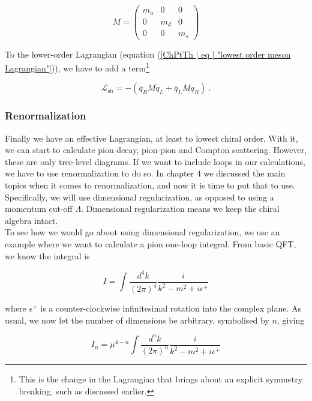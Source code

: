 \documentclass[10pt,twoside]{report}
\begin{document}
	\begin{equation}
		M = \begin{pmatrix}
		m_u & 0 & 0 \\
		0 & m_d & 0 \\
		0 & 0 & m_s
		\end{pmatrix}
	\end{equation}
	
	To the lower-order Lagrangian (equation (\ref{ChPtTh | eq | "lowest order meson Lagrangian"})), we have to add a term\footnote{This is the change in the Lagrangian that brings about an explicit symmetry breaking, such as discussed earlier.}
	
	\begin{equation}
		\mathcal{L}_{\text{sb}} = -\left( \bar{q}_R M q_L + \bar{q}_LMq_R \right) \:.
	\end{equation}
	
	\subsubsection{Renormalization}
	Finally we have an effective Lagrangian, at least to lowest chiral order. With it, we can start to calculate pion decay, pion-pion and Compton scattering. However, these are only tree-level diagrams. If we want to include loops in our calculations, we have to use renormalization to do so. In chapter 4 we discussed the main topics when it comes to renormalization, and now it is time to put that to use. Specifically, we will use dimensional regularization, as opposed to using a momentum cut-off $\Lambda$. Dimensional regularization means we keep the chiral algebra intact.\\
	
	To see how we would go about using dimensional regularization, we use an example \cite{SchererSchingler12} where we want to calculate a pion one-loop integral. From basic QFT, we know the integral is
	
	\begin{equation}
		I = \int\frac{d^4 k}{(2\pi)^4}\frac{i}{k^2 - m^2 + i\epsilon^+}
	\end{equation}
	
	\noindent where $\epsilon^+$ is a counter-clockwise infinitesimal rotation into the complex plane. As usual, we now let the number of dimensions be arbitrary, symbolised by $n$, giving
	
	\begin{equation}
	I_n = \mu^{4-n}\int\frac{d^n k}{(2\pi)^n}\frac{i}{k^2 - m^2 + i\epsilon^+}
	\end{equation}
	
\end{document}
